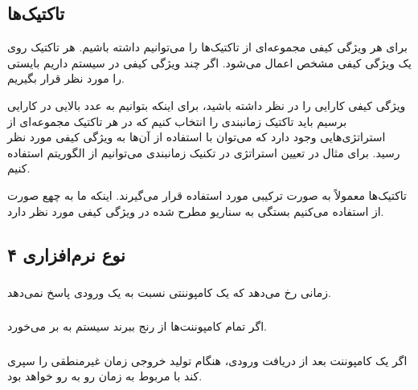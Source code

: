 \subsection{تاکتیک‌ها}

برای هر ویژگی کیفی مجموعه‌ای از تاکتیک‌ها را می‌توانیم داشته باشیم. هر تاکتیک
روی یک ویژگی کیفی مشخص اعمال می‌شود. اگر چند ویژگی کیفی در سیستم داریم بایستی
 را مورد نظر قرار بگیریم.

ویژگی کیفی کارایی را در نظر داشته باشید، برای اینکه بتوانیم به عدد بالایی در
کارایی برسیم باید تاکتیک زمانبندی را انتخاب کنیم که در هر تاکتیک مجموعه‌ای از
استراتژی‌هایی وجود دارد که می‌توان با استفاده از آن‌ها به ویژگی کیفی مورد نظر
رسید. برای مثال در تعیین استراتژی در تکنیک زمانبندی می‌توانیم از الگوریتم
 استفاده کنیم.

تاکتیک‌ها معمولاً به صورت ترکیبی مورد استفاده قرار می‌گیرند. اینکه ما به چهع
صورت از  استفاده می‌کنیم بستگی به سناریو مطرح شده در ویژگی کیفی
مورد نظر دارد.

\subsection{۴ نوع  نرم‌افزاری}

\subsubsection{}

زمانی رخ می‌دهد که یک کامپوننتی نسبت به یک ورودی پاسخ نمی‌دهد.

\subsubsection{}

اگر تمام کامپوننت‌ها از  رنج ببرند سیستم به  بر می‌خورد.

\subsubsection{}

اگر یک کامپوننت بعد از دریافت ورودی، هنگام تولید خروجی زمان غیرمنطقی را سپری کند
با  مربوط به زمان رو به رو خواهد بود.

\subsubsection{}

